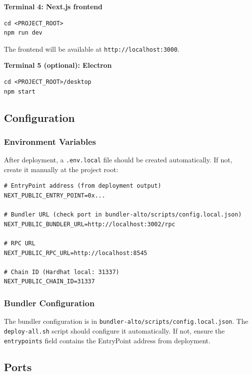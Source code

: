 \textbf{Terminal 4: Next.js frontend}

\begin{verbatim}
cd <PROJECT_ROOT>
npm run dev
\end{verbatim}

The frontend will be available at \texttt{http://localhost:3000}.

\textbf{Terminal 5 (optional): Electron}

\begin{verbatim}
cd <PROJECT_ROOT>/desktop
npm start
\end{verbatim}

\subsection{Configuration}

\subsubsection{Environment Variables}

After deployment, a \texttt{.env.local} file should be created automatically. If not, create it manually at the project root:

\begin{verbatim}
# EntryPoint address (from deployment output)
NEXT_PUBLIC_ENTRY_POINT=0x...

# Bundler URL (check port in bundler-alto/scripts/config.local.json)
NEXT_PUBLIC_BUNDLER_URL=http://localhost:3002/rpc

# RPC URL
NEXT_PUBLIC_RPC_URL=http://localhost:8545

# Chain ID (Hardhat local: 31337)
NEXT_PUBLIC_CHAIN_ID=31337
\end{verbatim}

\subsubsection{Bundler Configuration}

The bundler configuration is in \texttt{bundler-alto/scripts/config.local.json}. The \texttt{deploy-all.sh} script should configure it automatically. If not, ensure the \texttt{entrypoints} field contains the EntryPoint address from deployment.

\subsection{Ports}

